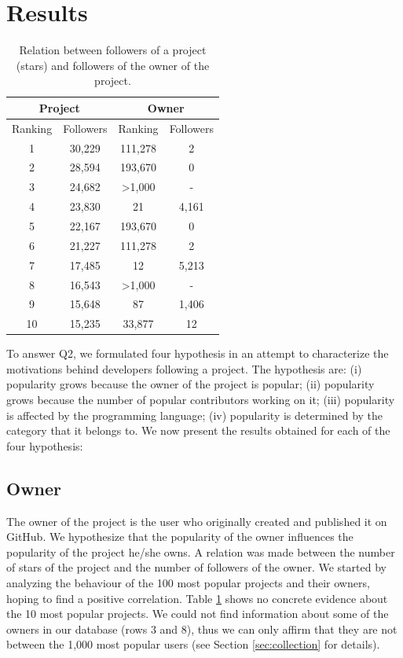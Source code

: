 
\section{Results}
\begin{table}
\centering
\begin{tabular}{ | c | c | c | c | }
	\hline
	\multicolumn{2}{|c|}{Project} & \multicolumn{2}{|c|}{Owner} \\ \hline
	Ranking & Followers & Ranking & Followers \\ \hline
	1 & 30,229 & 111,278 & 2 \\ \hline
	2 & 28,594 & 193,670 & 0 \\ \hline
	3 & 24,682 & >1,000 & -  \\ \hline
	4 & 23,830 & 21 & 4,161 \\ \hline
	5 & 22,167 & 193,670 & 0 \\ \hline
	6 & 21,227 & 111,278 & 2 \\ \hline
	7 & 17,485 & 12 & 5,213 \\ \hline
	8 & 16,543 & >1,000 & - \\ \hline
	9 & 15,648 & 87 & 1,406 \\ \hline
	10 & 15,235 & 33,877 & 12 \\ \hline
\end{tabular}
\caption{Relation between followers of a project (stars) and followers of the owner of the project. }
\label{tbl:owner}
\end{table}
\label{sec:results}

To answer Q2, we formulated four hypothesis in an attempt to characterize the motivations behind developers following a project. The hypothesis are: (i) popularity grows because the owner of the project is popular; (ii) popularity grows because the number of popular contributors working on it; (iii) popularity is affected by the programming language; (iv) popularity is determined by the category that it belongs to. We now present the results obtained for each of the four hypothesis:

\subsection{Owner}

The owner of the project is the user who originally created and published it on GitHub. We hypothesize that the popularity of the owner influences the popularity of the project he/she owns. A relation was made between the number of stars of the project and the number of followers of the owner. We started by analyzing the behaviour of the 100 most popular projects and their owners, hoping to find a positive correlation. Table \ref{tbl:owner} shows no concrete evidence about the 10 most popular projects. We could not find information about some of the owners in our database (rows 3 and 8), thus we can only affirm that they are not between the 1,000 most popular users (see Section \ref{sec:collection} for details).


